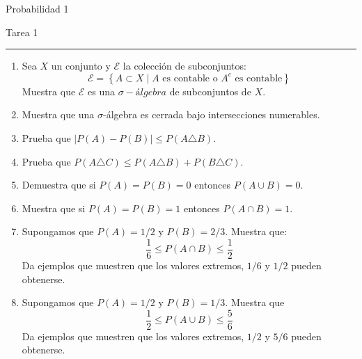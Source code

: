 \documentclass{report}
\begin{document}
\begin{center}
    \textsf{\Large Probabilidad 1}
    \par\medskip
    \textsf{\large Tarea 1}
    \end{center}
    \hrule
    \par\bigskip

\begin{enumerate}
    \item Sea $X$ un conjunto y $\mathcal{E}$ la colección de subconjuntos:
    $$
    \mathcal{E} = \left\{A\subset X \mid A \text{ es contable o } A^c \text{ es contable}  \right\}
    $$
    Muestra que $\mathcal{E}$ es una $\sigma-álgebra$ de subconjuntos de $X$.
    \item Muestra que una $\sigma$-álgebra es cerrada bajo intersecciones numerables.
    \item Prueba que $\left|P(A)-P(B)\right|\leq P(A\triangle B)$.
    \item Prueba que $P(A\triangle C)\leq P(A\triangle B) + P(B\triangle C)$.
    \item Demuestra que si $P(A) = P(B) = 0 $ entonces $P(A\cup B) = 0$.
    \item Muestra que si $P(A) = P(B) = 1$ entonces $P(A\cap B) = 1$.
    \item Supongamos que $P(A)= 1/2$ y $P(B)= 2/3$. Muestra que:
    $$
    \frac{1}{6} \leq P(A\cap B) \leq \frac{1}{2}
    $$
    Da ejemplos que muestren que los valores extremos, $1/6$ y $1/2$ pueden obtenerse.
    \item Supongamos que $P(A) = 1/2$ y $P(B) = 1/3$. Muestra que
    $$
    \frac{1}{2}\leq P(A\cup B)\leq \frac{5}{6}
    $$
    Da ejemplos que muestren que los valores extremos, $1/2$ y $5/6$ pueden obtenerse.
\end{enumerate}
\end{document}
